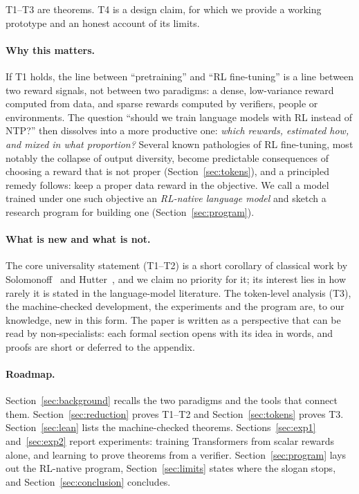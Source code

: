 \documentclass[11pt]{article}
\theoremstyle{definition}
\begin{document}
\noindent T1--T3 are theorems. T4 is a design claim, for which we provide a working prototype and an honest account of its limits.

\paragraph{Why this matters.} If T1 holds, the line between ``pretraining'' and ``RL fine-tuning'' is a line between two reward signals, not between two paradigms: a dense, low-variance reward computed from data, and sparse rewards computed by verifiers, people or environments. The question ``should we train language models with RL instead of NTP?'' then dissolves into a more productive one: \emph{which rewards, estimated how, and mixed in what proportion?} Several known pathologies of RL fine-tuning, most notably the collapse of output diversity, become predictable consequences of choosing a reward that is not proper (Section~\ref{sec:tokens}), and a principled remedy follows: keep a proper data reward in the objective. We call a model trained under one such objective an \emph{RL-native language model} and sketch a research program for building one (Section~\ref{sec:program}).

\paragraph{What is new and what is not.} The core universality statement (T1--T2) is a short corollary of classical work by Solomonoff~\cite{solomonoff1964,solomonoff1978} and Hutter~\cite{hutter2001nonbinary,hutter2003general,hutter2005book}, and we claim no priority for it; its interest lies in how rarely it is stated in the language-model literature. The token-level analysis (T3), the machine-checked development, the experiments and the program are, to our knowledge, new in this form. The paper is written as a perspective that can be read by non-specialists: each formal section opens with its idea in words, and proofs are short or deferred to the appendix.

\paragraph{Roadmap.} Section~\ref{sec:background} recalls the two paradigms and the tools that connect them. Section~\ref{sec:reduction} proves T1--T2 and Section~\ref{sec:tokens} proves T3. Section~\ref{sec:lean} lists the machine-checked theorems. Sections~\ref{sec:exp1} and~\ref{sec:exp2} report experiments: training Transformers from scalar rewards alone, and learning to prove theorems from a verifier. Section~\ref{sec:program} lays out the RL-native program, Section~\ref{sec:limits} states where the slogan stops, and Section~\ref{sec:conclusion} concludes.
\end{document}
